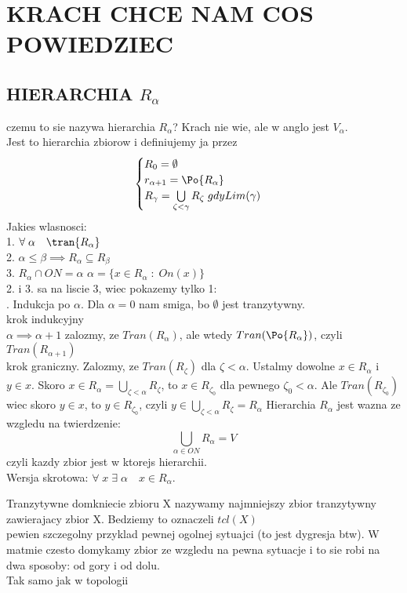 \documentclass{article}
\begin{document}
\ttfamily
\section*{KRACH CHCE NAM COS POWIEDZIEC}
\subsection*{HIERARCHIA $R_\alpha$}
czemu to sie nazywa hierarchia $R_\alpha$? Krach nie wie, ale w anglo jest $V_\alpha$.\bigskip\\
Jest to hierarchia zbiorow i definiujemy ja przez
$$\begin{cases} R_0=\emptyset\\r_{\alpha+1}=\Po{R_\alpha}\\R_\gamma=\bigcup\limits_{\zeta<\gamma}R_\zeta\;gdy Lim(\gamma)\end{cases}$$
Jakies wlasnosci:\\
1. $\forall\;\alpha\quad \tran{R_\alpha}$\\
2. $\alpha\leq\beta\implies R_\alpha\subseteq R_\beta$\\
3. $R_\alpha\cap ON=\alpha$ $\alpha=\{x\in R_\alpha\;:\;On(x)\}$\bigskip\\
2. i 3. sa na liscie 3, wiec pokazemy tylko 1:\bigskip\\
. Indukcja po $\alpha$. Dla $\alpha=0$ nam smiga, bo $\emptyset$ jest tranzytywny.\medskip\\
krok indukcyjny\\
$\alpha\implies \alpha+1$ zalozmy, ze $Tran(R_\alpha)$, ale wtedy $Tran(\Po{R_\alpha})$, czyli $Tran(R_{\alpha+1})$\medskip\\
krok graniczny. Zalozmy, ze $Tran(R_\zeta)$ dla $\zeta<\alpha$. Ustalmy dowolne $x\in R_\alpha$ i $y\in x$. Skoro $x\in R_\alpha=\bigcup\limits_{\zeta<\alpha}R_\zeta$, to $x\in R_{\zeta_0}$ dla pewnego $\zeta_0<\alpha$. Ale $Tran(R_{\zeta_0})$ wiec skoro $y\in x$, to $y\in R_{\zeta_0}$, czyli $y\in \bigcup\limits_{\zeta<\alpha}R_\zeta=R_\alpha$
\kondow
Hierarchia $R_\alpha$ jest wazna ze wzgledu na twierdzenie:
$$\bigcup\limits_{\alpha\in ON}R_\alpha=V$$
czyli kazdy zbior jest w ktorejs hierarchii.\smallskip\\
Wersja skrotowa: $\forall\;x\;\exists\;\alpha\quad x\in R_\alpha$.\bigskip
\begin{center}\large
    {\color{def}Tranzytywne domkniecie zbioru} X nazywamy najmniejszy zbior tranzytywny zawierajacy zbior X. Bedziemy to oznaczeli $tcl(X)$\\
    pewien szczegolny przyklad pewnej ogolnej sytuajci (to jest dygresja btw). W matmie czesto domykamy zbior ze wzgledu na pewna sytuacje i to sie robi na dwa sposoby: od gory i od dolu.\\
    Tak samo jak w topologii
\end{center}
\end{document}
